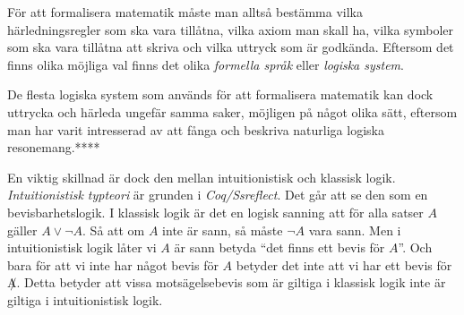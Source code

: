 För att formalisera matematik måste man alltså bestämma vilka härledningsregler
som ska vara tillåtna, vilka axiom man skall ha, vilka symboler som ska vara
tillåtna att skriva och vilka uttryck som är godkända. Eftersom det finns olika
möjliga val finns det olika \emph{formella språk} eller \emph{logiska system}.

De flesta logiska system som används för att formalisera matematik kan dock
uttrycka och härleda ungefär samma saker, möjligen på något olika sätt,
eftersom man har varit intresserad av att fånga och beskriva naturliga logiska
resonemang.****

En viktig skillnad är dock den mellan intuitionistisk och klassisk logik.
\emph{Intuitionistisk typteori}\cite{martin1984intuitionistic} är grunden i
\emph{Coq/Ssreflect}\cite{bertot2004interactive}. Det går att se den som en
bevisbarhetslogik. I klassisk logik är det en logisk sanning att för alla
satser $A$ gäller $A \lor \neg A$. Så att om $A$ inte är sann, så måste
$\neg A$ vara sann. Men i intuitionistisk logik låter vi $A$ är sann betyda
``det finns ett bevis för $A$''. Och bara för att vi inte har något bevis för
$A$ betyder det inte att vi har ett bevis för $\not A$. Detta betyder att vissa
motsägelsebevis som är giltiga i klassisk logik inte är giltiga i
intuitionistisk logik. \cite{proofdependent}
